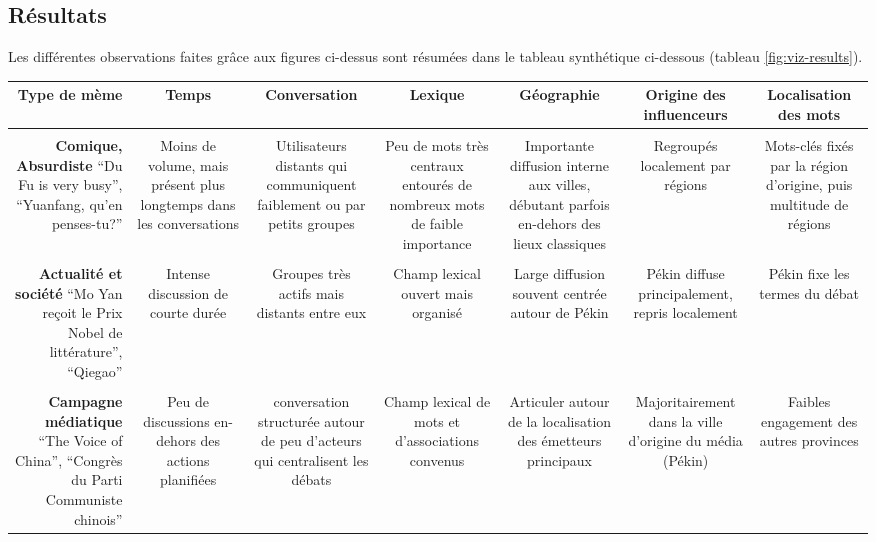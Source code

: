 \subsection[Résumé des résultats]{Résultats}

Les différentes observations faites grâce aux figures ci-dessus sont résumées dans le tableau synthétique ci-dessous (tableau \ref{fig:viz-results}).

\begin{table}[h!]
    \begin{minipage}{20.5cm}
    \begin{turn}{90}
    \begin{tabulary}{\linewidth}{ R | C C C C C C}

        \textbf{Type de mème} & 
        \textbf{Temps} &  
        \textbf{Conversation} &  
        \textbf{Lexique} &
        \textbf{Géographie} &
        \textbf{Origine des influenceurs} &
        \textbf{Localisation des mots} \\

        \hline \\[-1.2ex]
        \textbf{Comique, Absurdiste} \newline
        \small{ ``Du Fu is very busy'', ``Yuanfang, qu'en penses-tu?'' } &
        Moins de volume, mais présent  plus longtemps dans les conversations &
        Utilisateurs distants qui communiquent faiblement ou par petits groupes &
        Peu de mots très centraux entourés de nombreux mots de faible importance &
        Importante diffusion interne aux villes, débutant parfois en-dehors des lieux classiques &
        Regroupés localement par régions & 
        Mots-clés fixés par la région d'origine, puis multitude de régions \\
        \hline \\[-1.2ex]
        \textbf{Actualité et société}  \newline
        \small{``Mo Yan reçoit le Prix Nobel de littérature'', ``Qiegao''}&
        Intense discussion de courte durée &
        Groupes très actifs mais distants entre eux  &
        Champ lexical ouvert mais organisé &
        Large diffusion souvent centrée autour de Pékin &
        Pékin diffuse principalement, repris localement  &
        Pékin fixe les termes du débat \\

        \hline \\[-1.2ex]
        \textbf{Campagne médiatique} \newline
        \small{``The Voice of China'', ``Congrès du Parti Communiste chinois''} &
        Peu de discussions en-dehors des actions planifiées &
        conversation structurée autour de peu d{\textquoteright}acteurs qui centralisent les débats &
        Champ lexical de mots et d'associations convenus  &
        Articuler autour de la localisation des émetteurs principaux &
        Majoritairement dans la ville d'origine du média (Pékin) &
        Faibles engagement des autres provinces \\


\end{tabulary}
\end{turn}
\end{minipage}
\end{table}
